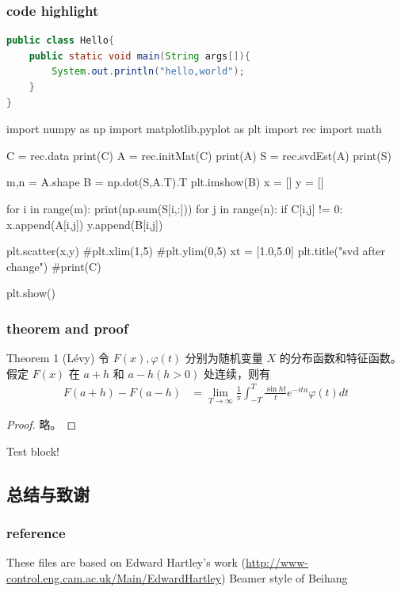 \documentclass[UTF8]{beamer}
\begin{document}
\begin{frame}[fragile]
    \frametitle{code highlight}
    \begin{lstlisting}[language=java]
public class Hello{
    public static void main(String args[]){
        System.out.println("hello,world");
    }
}\end{lstlisting}
\end{frame}

\begin{python}
import numpy as np
import matplotlib.pyplot as plt
import rec
import math

C = rec.data
print(C)
A = rec.initMat(C)
print(A)
S = rec.svdEst(A)
print(S)

m,n  = A.shape
B = np.dot(S,A.T).T
plt.imshow(B)
x = []
y = []

for i in range(m):
	print(np.sum(S[i,:]))
	for j in range(n):
		if C[i,j] != 0:
			x.append(A[i,j])
			y.append(B[i,j])


plt.scatter(x,y)
#plt.xlim(1,5)
#plt.ylim(0,5)
xt = [1.0,5.0]
plt.title("svd after change")
#print(C)

plt.show()\end{python}

\begin{frame}
    \frametitle{theorem and proof}
    \begin{exampleblock}{Theorem 1 (L\'{e}vy)}
    令 $F(x),\varphi(t)$ 分别为随机变量 $X$ 的分布函数和特征函数。
    假定 $F(x)$ 在 $a+h$ 和 $a-h (h>0)$ 处连续，则有
    \begin{align}
    \label{Levy theorem}  %
    F(a+h)-F(a-h)&=\lim_{T\rightarrow\infty}\frac{1}{\pi}\int^{T}_{-T}\frac{\sin ht}{t}
    e^{-ita}\varphi(t)dt
    \end{align}
    \end{exampleblock}
    \begin{proof}
        略。
    \end{proof}
    \begin{alertblock}
        Test block!
    \end{alertblock}
\end{frame}

\subsection{总结与致谢}

\begin{frame}
    \frametitle{reference}
    \begin{thebibliography}{99} 
     These files are based on Edward Hartley's work
        (\url{http://www-control.eng.cam.ac.uk/Main/EdwardHartley})
     Beamer style of Beihang
    \end{thebibliography}
\end{frame}

\begin{frame}
    \\
\end{frame}
\end{document}

